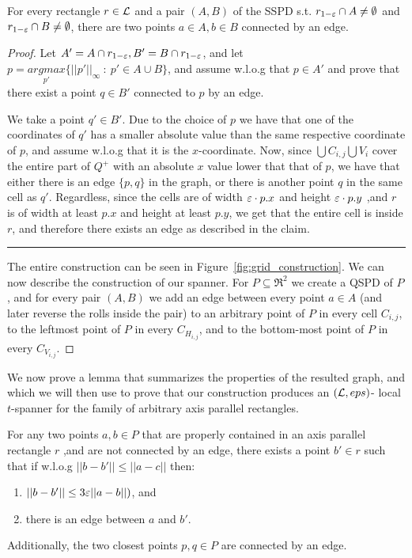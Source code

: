 \documentclass[12pt]{article}%
\begin{document}
\begin{claim}
    For every rectangle $r\in \mathcal{L}$ and a pair $(A,B)$ of the SSPD
    s.t. $r_{1-\varepsilon}\cap A \neq \emptyset$ and
    $r_{1-\varepsilon}\cap B \neq \emptyset$, there are two points
    $a\in A, b\in B$ connected by an edge.
\end{claim}

\begin{proof}
    Let $A'=A\cap r_{1-\varepsilon}, B'=B \cap r_{1-\varepsilon}$, and let
    $p= \underset{p'}{argmax}\{||p'||_{\infty}~:~ p'\in A\cup B\}$,
    and assume w.l.o.g that $p\in A'$ and prove that there exist a
    point $q\in B'$ connected to $p$ by an edge.
    
    We take a point $q'\in B'$. Due to the choice of $p$ we have that
    one of the coordinates of $q'$ has a smaller absolute value than
    the same respective coordinate of $p$, and assume w.l.o.g that it
    is the $x$-coordinate. Now, since $\bigcup C_{i,j} \bigcup V_i$
    cover the entire part of $Q^+$ with an absolute $x$ value lower
    that that of $p$, we have that either there is an edge $\{p,q\}$
    in the graph, or there is another point $q$ in the same cell as
    $q'$. Regardless, since the cells are of width $\varepsilon\cdot p.x$ and
    height $\varepsilon\cdot p.y$ ,and $r$ is of width at least $p.x$ and
    height at least $p.y$, we get that the entire cell is inside $r$,
    and therefore there exists an edge as described in the claim.
    
    \hrule

    The entire construction can be seen in
    Figure~\ref{fig:grid_construction}. We can now describe the
    construction of our spanner. For $P\subseteq \Re^2$ we create a
    QSPD of $P$, and for every pair $(A,B)$ we add an edge between
    every point $a\in A$ (and later reverse the rolls inside the pair)
    to an arbitrary point of $P$ in every cell $C_{i,j}$, to the
    leftmost point of $P$ in every $C_{H_{i,j}}$, and to the
    bottom-most point of $P$ in every $C_{V_{i,j}}$.
\end{proof}

We now prove a lemma that summarizes the properties of the resulted
graph, and which we will then use to prove that our construction
produces an $(\mathcal{L}, eps)$- local $t$-spanner for the family of
arbitrary axis parallel rectangles.


\begin{claim}
    \label{clm:span_properties}
    For any two points $a,b\in P$ that are properly contained in an
    axis parallel rectangle $r$ ,and are not connected by an edge,
    there exists a point $b'\in r$ such that if w.l.o.g
    $||b-b'|| \leq ||a-c||$ then:
    \begin{enumerate}
        \item $||b-b'|| \leq 3\varepsilon ||a-b||)$, and
        \item there is an edge between $a$ and $b'$.
    \end{enumerate}
    Additionally, the two closest points $p,q\in P$ are connected by
    an edge.
	
\end{claim}
\end{document}
